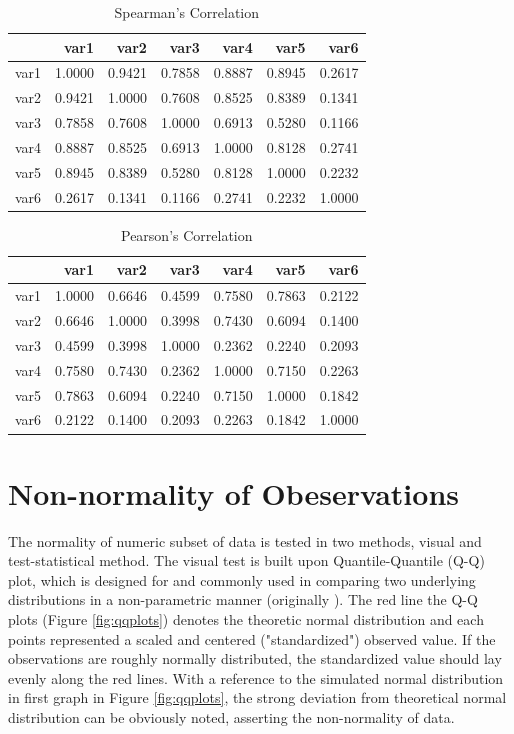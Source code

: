 \documentclass[utf8,english]{gradu3}
\begin{document}
\begin{table}[ht]
\caption{Spearman's Correlation}
\centering
\begin{tabular}{rrrrrrr}
  \hline
 & var1 & var2 & var3 & var4 & var5 & var6 \\ 
  \hline
var1 & 1.0000 & 0.9421 & 0.7858 & 0.8887 & 0.8945 & 0.2617 \\ 
  var2 & 0.9421 & 1.0000 & 0.7608 & 0.8525 & 0.8389 & 0.1341 \\ 
  var3 & 0.7858 & 0.7608 & 1.0000 & 0.6913 & 0.5280 & 0.1166 \\ 
  var4 & 0.8887 & 0.8525 & 0.6913 & 1.0000 & 0.8128 & 0.2741 \\ 
  var5 & 0.8945 & 0.8389 & 0.5280 & 0.8128 & 1.0000 & 0.2232 \\ 
  var6 & 0.2617 & 0.1341 & 0.1166 & 0.2741 & 0.2232 & 1.0000 \\ 
   \hline
\end{tabular}
\end{table}

\begin{table}[ht]
\caption{Pearson's Correlation}
\centering
\begin{tabular}{rrrrrrr}
  \hline
 & var1 & var2 & var3 & var4 & var5 & var6 \\ 
  \hline
var1 & 1.0000 & 0.6646 & 0.4599 & 0.7580 & 0.7863 & 0.2122 \\ 
  var2 & 0.6646 & 1.0000 & 0.3998 & 0.7430 & 0.6094 & 0.1400 \\ 
  var3 & 0.4599 & 0.3998 & 1.0000 & 0.2362 & 0.2240 & 0.2093 \\ 
  var4 & 0.7580 & 0.7430 & 0.2362 & 1.0000 & 0.7150 & 0.2263 \\ 
  var5 & 0.7863 & 0.6094 & 0.2240 & 0.7150 & 1.0000 & 0.1842 \\ 
  var6 & 0.2122 & 0.1400 & 0.2093 & 0.2263 & 0.1842 & 1.0000 \\ 
   \hline
\end{tabular}
\end{table}

\section{Non-normality of Obeservations}
\label{app:normality}

The normality of numeric subset of data is tested in two methods, visual and test-statistical method. The visual test is built upon Quantile-Quantile (Q-Q) plot, which is designed for and commonly used in comparing two underlying distributions in a non-parametric manner (originally \cite{wilk1968probability}). The red line the Q-Q plots (Figure \ref{fig:qqplots}) denotes the theoretic normal distribution and each points represented a scaled and centered ("standardized") observed value. If the observations are roughly normally distributed, the standardized value should lay evenly along the red lines. With a reference to the simulated normal distribution in first graph in Figure \ref{fig:qqplots}, the strong deviation from theoretical normal distribution can be obviously noted, asserting the non-normality of data.
\end{document}
